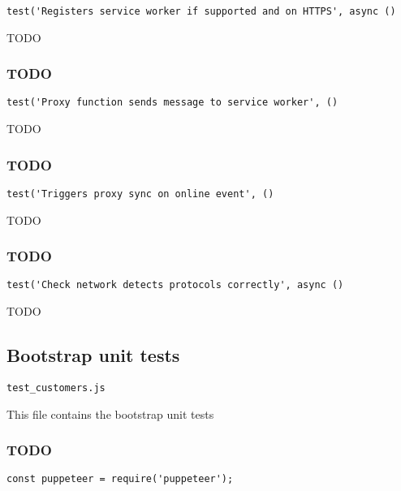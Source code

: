 \documentclass[a4paper]{article}
\begin{document}
\begin{lstlisting}
test('Registers service worker if supported and on HTTPS', async ()
\end{lstlisting}

TODO

\hypertarget{toc542}{}
\subsubsection{TODO}

\begin{lstlisting}
test('Proxy function sends message to service worker', ()
\end{lstlisting}

TODO

\hypertarget{toc543}{}
\subsubsection{TODO}

\begin{lstlisting}
test('Triggers proxy sync on online event', ()
\end{lstlisting}

TODO

\hypertarget{toc544}{}
\subsubsection{TODO}

\begin{lstlisting}
test('Check network detects protocols correctly', async ()
\end{lstlisting}

TODO

\hypertarget{toc545}{}
\subsection{Bootstrap unit tests}

\begin{lstlisting}
test_customers.js
\end{lstlisting}

This file contains the bootstrap unit tests

\hypertarget{toc546}{}
\subsubsection{TODO}

\begin{lstlisting}
const puppeteer = require('puppeteer');
\end{lstlisting}
\end{document}
